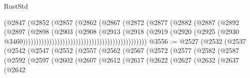 \begin{lexlean}{RustStd}
\begin{coremodule}
                                                          (@2847
                                                            (@2852
                                                              (@2857
                                                                (@2862
                                                                  (@2867
                                                                    (@2872
                                                                      (@2877
                                                                        (@2882
                                                                          (@2887
                                                                            (@2892
                                                                              (@2897
                                                                                (@2898
                                                                                  (@2903
                                                                                    (@2908
                                                                                      (@2913
                                                                                        (@2918
                                                                                          (@2919
                                                                                            (@2920
                                                                                              (@2925
                                                                                                (@2930
                                                                                                  @3460)))))))))))))))))))))))))))))))))))))))))))))))
@3556 := @2527
    (@2532
      (@2537
        (@2542
          (@2547
            (@2552
              (@2557
                (@2562
                  (@2567
                    (@2572
                      (@2577
                        (@2582
                          (@2587
                            (@2592
                              (@2597
                                (@2602
                                  (@2607
                                    (@2612
                                      (@2617
                                        (@2622
                                          (@2627
                                            (@2632
                                              (@2637
                                                (@2642

\end{coremodule}
\end{lexlean}
